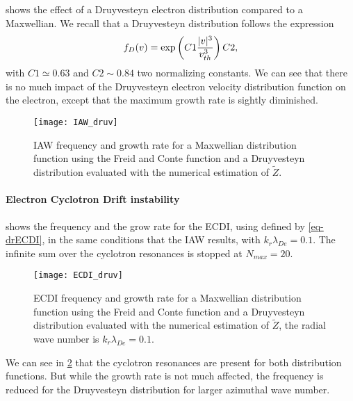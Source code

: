      shows the effect of a Druyvesteyn electron distribution compared to a Maxwellian.
    We recall that a Druyvesteyn distribution follows the expression
    \begin{equation} \label{eq-druyv}
      f_{D}(v) = \exp \left( C1 \frac{\lvert v\rvert^3}{v_{th}^3}  \right) C2,
    \end{equation}
    with $C1 \simeq 0.63$ and $C2 \sim 0.84$ two normalizing constants.
    We can see that there is no much impact of the Druyvesteyn electron velocity distribution function on the electron, except that the maximum growth rate is sightly diminished.
    
    \begin{figure}[hbtp]
      \centering
      \texttt{[image: IAW\_druv]}
      \caption{\ac{IAW} frequency and growth rate for a Maxwellian distribution function using the Freid and Conte function and a Druyvesteyn distribution evaluated with the numerical estimation of $\tilde{Z}$. }
      \label{fig-IAW_druv}
    \end{figure}
    
    \paragraph{Electron Cyclotron Drift instability\\}
    
       shows the frequency and the grow rate for the \ac{ECDI}, using defined by \cref{eq-drECDI}, in the same conditions that the \ac{IAW} results, with $k_r \lambda_{De} = 0.1 $.
      The infinite sum over the cyclotron resonances is stopped at $N_{max} = 20$.
      
      
      \begin{figure}[hbtp]
      \centering
      \texttt{[image: ECDI\_druv]}
      \caption{\ac{ECDI} frequency and growth rate for a Maxwellian distribution function using the Freid and Conte function and a Druyvesteyn distribution evaluated with the numerical estimation of $\tilde{Z}$, the radial wave number is $k_r \lambda_{De} = 0.1 $.}
      \label{fig-ECDI_druv}
    \end{figure}
    
    We can see in \cref{fig-ECDI_druv} that the cyclotron resonances are present for both distribution functions.
    But while the growth rate is not much affected, the frequency is reduced for the Druyvesteyn distribution for larger azimuthal wave number.
    
